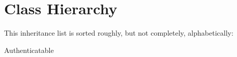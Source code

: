 \section{Class Hierarchy}
This inheritance list is sorted roughly, but not completely, alphabetically\+:\begin{DoxyCompactList}
\item Authenticatable\begin{DoxyCompactList}
\item {}
\end{DoxyCompactList}
\end{DoxyCompactList}
